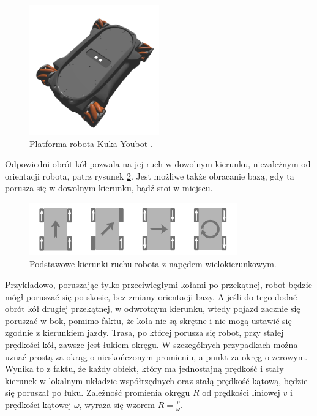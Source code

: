 	\begin{figure}[H]
	\centering
	\includegraphics[width=0.5\textwidth]{graphics/kuka_youbot.png}
	\caption{Platforma robota Kuka Youbot \cite{kuka}.}
	\label{fig:kuka_youbot}
	\end{figure} 

	Odpowiedni obrót kół pozwala na jej ruch w dowolnym kierunku, niezależnym od orientacji robota, patrz rysunek \ref{fig:mecanum_dirs}.
	Jest możliwe także obracanie bazą, gdy ta porusza się w dowolnym kierunku, bądź stoi w miejscu.
	
	\begin{figure}[H]
	\centering
	\includegraphics[width=0.8\textwidth]{graphics/mecanum_dirs.pdf}
	\caption{Podstawowe kierunki ruchu robota z napędem wielokierunkowym.}
	\label{fig:mecanum_dirs}
	\end{figure} 
	
	Przykładowo, poruszając tylko przeciwległymi kołami po przekątnej, robot będzie mógł poruszać się po skosie, bez zmiany orientacji bazy.
	A jeśli do tego dodać obrót kół drugiej przekątnej, w odwrotnym kierunku, wtedy pojazd zacznie się poruszać w bok, pomimo faktu, że koła nie są skrętne i 
	nie mogą ustawić się zgodnie z kierunkiem jazdy.
	Trasa, po której porusza się robot, przy stałej prędkości kół, zawsze jest łukiem okręgu. 
	W szczególnych przypadkach można uznać prostą za okrąg o nieskończonym promieniu, a punkt za okręg o zerowym. 
	Wynika to z faktu, że każdy obiekt, który ma jednostajną prędkość i stały kierunek w lokalnym układzie współrzędnych oraz stałą prędkość kątową, będzie się poruszał po łuku.
	Zależność promienia okręgu $R$ od prędkości liniowej $v$ i prędkości kątowej $\omega$, wyraża się wzorem $R = \frac{v}{\omega}$.

